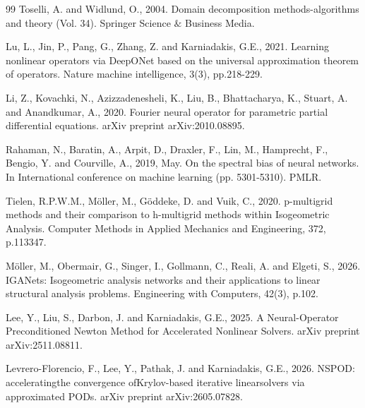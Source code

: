 \documentclass{article}
\theoremstyle{plain}
\numberwithin{equation}{section}
\begin{document}
\begin{thebibliography}{99}
    Toselli, A. and Widlund, O., 2004. Domain decomposition methods-algorithms and theory (Vol. 34). Springer Science $\&$ Business Media.

    Lu, L., Jin, P., Pang, G., Zhang, Z. and Karniadakis, G.E., 2021. Learning nonlinear operators via DeepONet based on the universal approximation theorem of operators. Nature machine intelligence, 3(3), pp.218-229.

    Li, Z., Kovachki, N., Azizzadenesheli, K., Liu, B., Bhattacharya, K., Stuart, A. and Anandkumar, A., 2020. Fourier neural operator for parametric partial differential equations. arXiv preprint arXiv:2010.08895.

    Rahaman, N., Baratin, A., Arpit, D., Draxler, F., Lin, M., Hamprecht, F., Bengio, Y. and Courville, A., 2019, May. On the spectral bias of neural networks. In International conference on machine learning (pp. 5301-5310). PMLR.

    Tielen, R.P.W.M., Möller, M., Göddeke, D. and Vuik, C., 2020. p-multigrid methods and their comparison to h-multigrid methods within Isogeometric Analysis. Computer Methods in Applied Mechanics and Engineering, 372, p.113347.

    Möller, M., Obermair, G., Singer, I., Gollmann, C., Reali, A. and Elgeti, S., 2026. IGANets: Isogeometric analysis networks and their applications to linear structural analysis problems. Engineering with Computers, 42(3), p.102.

    Lee, Y., Liu, S., Darbon, J. and Karniadakis, G.E., 2025. A Neural-Operator Preconditioned Newton Method for Accelerated Nonlinear Solvers. arXiv preprint arXiv:2511.08811.

    Levrero-Florencio, F., Lee, Y., Pathak, J. and Karniadakis, G.E., 2026. NSPOD: acceleratingthe convergence ofKrylov-based iterative linearsolvers via approximated PODs. arXiv preprint arXiv:2605.07828.

\end{thebibliography}
\end{document}
